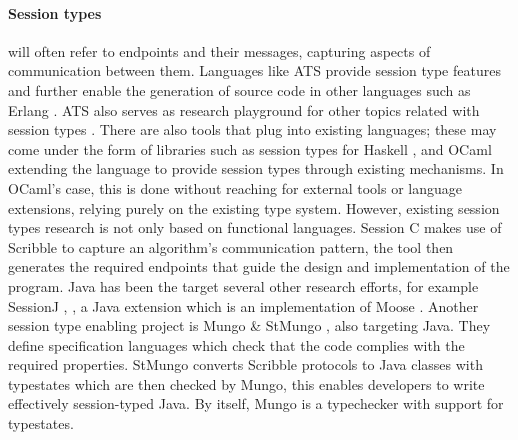 \paragraph{Session types} will often refer to endpoints and their messages, capturing aspects of communication between them.
Languages like ATS provide session type features and further enable the generation of source code in other languages
such as Erlang \autocite{Xi2016}. ATS also serves as research playground for other topics related with session types \autocite{Xi2016a}.
There are also tools that plug into existing languages;
these may come under the form of libraries such as session types
for Haskell \autocite[Section 3.3]{Ancona2016}, \autocite[Chapter 10]{Gay2017} and OCaml \autocite[Chapter 11]{Gay2017}
extending the language to provide session types through existing mechanisms.
In OCaml's case, this is done without reaching for external tools or language extensions,
relying purely on the existing type system.
However, existing session types research is not only based on functional languages.
Session C \autocite[Section 4.1]{Ancona2016} makes use of Scribble \autocite{Yoshida2014} to capture an algorithm's communication pattern,
the tool then generates the required endpoints that guide the design and implementation of the program.
Java has been the target several other research efforts, for example SessionJ \autocite[Section 2.2.1]{Ancona2016}, \autocite{Hu2008},
a Java extension which is an implementation of Moose \autocite[Section 2.1.1]{Ancona2016}.
Another session type enabling project is Mungo \& StMungo \autocite{Kouzapas2018, Voinea2020}, also targeting Java.
They define specification languages which check that the code complies with the required properties.
StMungo converts Scribble protocols to Java classes with typestates which are then checked by Mungo,
this enables developers to write effectively session-typed Java.
By itself, Mungo is a typechecker with support for typestates.


